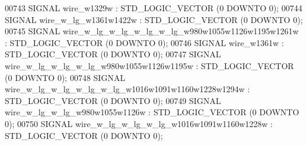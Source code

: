 \begin{DoxyCode}
{00743      \textcolor{keywordflow}{SIGNAL}  \textcolor{vhdlchar}{wire_w1329w}    \textcolor{vhdlchar}{:}   \textcolor{comment}{STD\_LOGIC\_VECTOR} \textcolor{vhdlchar}{(}\textcolor{vhdllogic}{}\textcolor{vhdllogic}{0} \textcolor{keywordflow}{DOWNTO} \textcolor{vhdllogic}{}\textcolor{vhdllogic}{0}\textcolor{vhdlchar}{)};
00744      \textcolor{keywordflow}{SIGNAL}  \textcolor{vhdlchar}{wire_w_lg_w1361w1422w}  \textcolor{vhdlchar}{:}   \textcolor{comment}{STD\_LOGIC\_VECTOR} \textcolor{vhdlchar}{(}\textcolor{vhdllogic}{}\textcolor{vhdllogic}{0} \textcolor{keywordflow}{DOWNTO} \textcolor{vhdllogic}{}\textcolor{vhdllogic}{0}\textcolor{vhdlchar}{)};
00745      \textcolor{keywordflow}{SIGNAL}  \textcolor{vhdlchar}{wire_w_lg_w_lg_w_lg_w_lg_w980w1055w1126w1195w1261w} \textcolor{vhdlchar}{:}   \textcolor{comment}{STD\_LOGIC\_VECTOR} \textcolor{vhdlchar}{(}\textcolor{vhdllogic}{}\textcolor{vhdllogic}{0} \textcolor{keywordflow}{DOWNTO} \textcolor{vhdllogic}{}\textcolor{vhdllogic}{0}\textcolor{vhdlchar}{)};
00746      \textcolor{keywordflow}{SIGNAL}  \textcolor{vhdlchar}{wire_w1361w}    \textcolor{vhdlchar}{:}   \textcolor{comment}{STD\_LOGIC\_VECTOR} \textcolor{vhdlchar}{(}\textcolor{vhdllogic}{}\textcolor{vhdllogic}{0} \textcolor{keywordflow}{DOWNTO} \textcolor{vhdllogic}{}\textcolor{vhdllogic}{0}\textcolor{vhdlchar}{)};
00747      \textcolor{keywordflow}{SIGNAL}  \textcolor{vhdlchar}{wire_w_lg_w_lg_w_lg_w980w1055w1126w1195w}   \textcolor{vhdlchar}{:}   \textcolor{comment}{STD\_LOGIC\_VECTOR} \textcolor{vhdlchar}{(}\textcolor{vhdllogic}{}\textcolor{vhdllogic}{0} \textcolor{keywordflow}{DOWNTO} \textcolor{vhdllogic}{}\textcolor{vhdllogic}{0}\textcolor{vhdlchar}{)};
00748      \textcolor{keywordflow}{SIGNAL}  \textcolor{vhdlchar}{wire_w_lg_w_lg_w_lg_w_lg_w1016w1091w1160w1228w1294w}    \textcolor{vhdlchar}{:}   \textcolor{comment}{STD\_LOGIC\_VECTOR} \textcolor{vhdlchar}{(}\textcolor{vhdllogic}{}\textcolor{vhdllogic}{0} \textcolor{keywordflow}{DOWNTO} \textcolor{vhdllogic}{}\textcolor{vhdllogic}{0}\textcolor{vhdlchar}{)};
00749      \textcolor{keywordflow}{SIGNAL}  \textcolor{vhdlchar}{wire_w_lg_w_lg_w980w1055w1126w} \textcolor{vhdlchar}{:}   \textcolor{comment}{STD\_LOGIC\_VECTOR} \textcolor{vhdlchar}{(}\textcolor{vhdllogic}{}\textcolor{vhdllogic}{0} \textcolor{keywordflow}{DOWNTO} \textcolor{vhdllogic}{}\textcolor{vhdllogic}{0}\textcolor{vhdlchar}{)};
00750      \textcolor{keywordflow}{SIGNAL}  \textcolor{vhdlchar}{wire_w_lg_w_lg_w_lg_w1016w1091w1160w1228w}  \textcolor{vhdlchar}{:}   \textcolor{comment}{STD\_LOGIC\_VECTOR} \textcolor{vhdlchar}{(}\textcolor{vhdllogic}{}\textcolor{vhdllogic}{0} \textcolor{keywordflow}{DOWNTO} \textcolor{vhdllogic}{}\textcolor{vhdllogic}{0}\textcolor{vhdlchar}{)};
}
\end{DoxyCode}
